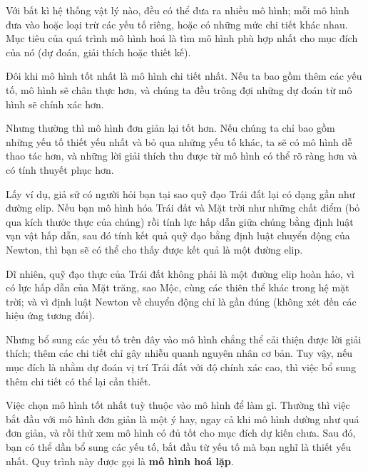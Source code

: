 \documentclass[12pt]{book}
\theoremstyle{exercise}
\begin{document}
Với bất kì hệ thống vật lý nào, đều có thể đưa ra nhiều mô hình; mỗi mô hình đưa vào hoặc loại trừ các yếu tố riêng, hoặc có những mức chi tiết khác nhau. Mục tiêu của quá trình mô hình hoá là tìm mô hình phù hợp nhất cho mục đích của nó (dự đoán, giải thích hoặc thiết kế).


Đôi khi mô hình tốt nhất là mô hình chi tiết nhất. Nếu ta bao gồm thêm các yếu tố, mô hình sẽ chân thực hơn, và chúng ta đều trông đợi những dự đoán từ mô hình sẽ chính xác hơn.


Nhưng thường thì mô hình đơn giản lại tốt hơn. Nếu chúng ta chỉ bao gồm những yếu tố thiết yếu nhất và bỏ qua những yếu tố khác, ta sẽ có mô hình dễ thao tác hơn, và những lời giải thích thu được từ mô hình có thể rõ ràng hơn và có tính thuyết phục hơn.


Lấy ví dụ, giả sử có người hỏi bạn tại sao quỹ đạo Trái đất lại có dạng gần như đường elip. Nếu bạn mô hình hóa Trái đất và Mặt trời như những chất điểm (bỏ qua kích thước thực của chúng) rồi tính lực hấp dẫn giữa chúng bằng định luật vạn vật hấp dẫn, sau đó tính kết quả quỹ đạo bằng định luật chuyển động của Newton, thì bạn sẽ có thể cho thấy được kết quả là một đường elip.


Dĩ nhiên, quỹ đạo thực của Trái đất không phải là một đường elip hoàn hảo, vì có lực hấp dẫn của Mặt trăng, sao Mộc, cùng các thiên thể khác trong hệ mặt trời; và vì định luật Newton về chuyển động chỉ là gần đúng (không xét đến các hiệu ứng tương đối).


Nhưng bổ sung các yếu tố trên đây vào mô hình chẳng thể cải thiện được lời giải thích; thêm các chi tiết chỉ gây nhiễu quanh nguyên nhân cơ bản. Tuy vậy, nếu mục đích là nhằm dự đoán vị trí Trái đất với độ chính xác cao, thì việc bổ sung thêm chi tiết có thể lại cần thiết. 

Việc chọn mô hình tốt nhất tuỳ thuộc vào mô hình để làm gì. Thường thì việc bắt đầu với mô hình đơn giản là một ý hay, ngay cả khi mô hình dường như quá đơn giản, và rồi thử xem mô hình có đủ tốt cho mục đích dự kiến chưa. Sau đó, bạn có thể dần bổ sung các yếu tố, bắt đầu từ yếu tố mà bạn nghĩ là thiết yếu nhất. Quy trình này được gọi là {\bf mô hình hoá lặp}.
\end{document}
